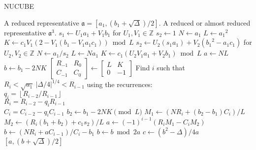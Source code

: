 \documentclass{ucalgthes1}
\theoremstyle{plain}
\theoremstyle{definition}
\newcommand{\ZZ}{\mathbb{Z}}
\newcommand{\matrixtt}[4]{\left[ \begin{array}{rr} #1 & #2 \\ #3 & #4 \end{array} \right]}
\newcommand{\floor}[1]{\left\lfloor #1 \right\rfloor}
\begin{document}
\begin{algorithm}[h]
\caption{NUCUBE}
\label{alg:nucube}
\begin{algorithmic}[1]
\REQUIRE A reduced representative $\mathfrak a = [a_1, (b_1+\sqrt\Delta)/2]$.
\ENSURE A reduced or almost reduced representative $\mathfrak a^3$.
\STATE $s_1 \gets U_1a_1 + V_1b_1$ for $U_1,V_1 \in \ZZ$
	\STATE $s_2 \gets 1$
	\STATE $N \gets a_1$
	\STATE $L \gets {a_1}^2$
	\STATE $K \gets c_1V_1(2-V_1(b_1-V_1a_1c_1)) \bmod L$
\ELSE
	\STATE $s_2 \gets U_2(s_1a_1) + V_2({b_1}^2-a_1c_1)$ for $U_2, V_2 \in \ZZ$
	\STATE $N \gets a_1/s_2$
	\STATE $L \gets Na_1$
	\STATE $K \gets c_1(U_2V_1a_1+V_2b_1) \bmod L$
\ENDIF
{}
	\STATE $a \gets NL$
	\STATE $b \gets b_1 - 2NK$
\ELSE
	\STATE $\matrixtt{R_{-1}}{R_0}{C_{-1}}{C_0} \gets \matrixtt{L}{K}{0}{-1}$
	\STATE Find $i$ such that $R_i < \sqrt{a_1} ~ |\Delta/4|^{1/4} < R_{i-1}$ using the recurrences:\\
	$q_i = \floor{R_{i-2}/R_{i-1}}$ \\
	$R_i = R_{i-2}-q_i R_{i-1}$ \\
	$C_i=C_{i-2}-q_i C_{i-1}$
	\STATE $b_2 \gets b_1 -2NK \pmod L$
	\STATE $M_1 \gets (NR_i + (b_2-b_1)C_i)/L$
	\STATE $M_2 \gets (R_i(b_1+b_2)+c_1s_2)/L$
	\STATE $a \gets (-1)^{i-1}(R_iM_1-C_iM_2)$
	\STATE $b \gets (NR_i + aC_{i-1})/C_i-b_1$
\ENDIF
\STATE $b \gets b \bmod 2a$
\STATE $c \gets (b^2-\Delta)/4a$ 
\RETURN $[a, (b+\sqrt\Delta)/2]$ 
\end{algorithmic}
\end{algorithm}
\end{document}
